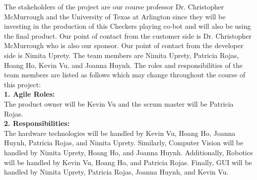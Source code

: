 The stakeholders of the project are our course professor Dr. Christopher McMurrough and the University of Texas at Arlington since they will be investing in the production of this Checkers playing co-bot and will also be using the final product. Our point of contact from the customer side is Dr. Christopher McMurrough who is also our sponsor. Our point of contact from the developer side is Nimita Uprety. The team members are Nimita Uprety, Patricia Rojas, Hoang Ho, Kevin Vu, and Joanna Huynh. The roles and responsibilities of the team members are listed as follows which may change throughout the course of this project:\\

\textbf{1. Agile Roles:} \\The product owner will be Kevin Vu and the scrum master will be Patricia Rojas.\\

\textbf{2. Responsibilities:} \\The hardware technologies will be handled by Kevin Vu, Hoang Ho, Joanna Huynh, Patricia Rojas, and Nimita Uprety. Similarly, Computer Vision will be handled by Nimita Uprety, Hoang Ho, and Joanna Huynh. Additionally, Robotics will be handled by Kevin Vu, Hoang Ho, and Patricia Rojas. Finally, GUI will be handled by Nimita Uprety, Patricia Rojas, Joanna Huynh, and Kevin Vu.